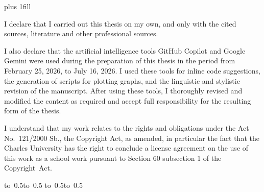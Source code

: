 \newpage


\openright
\hypersetup{pageanchor=true}
\vglue 0pt plus 1fill

\noindent
I declare that I carried out this \ThesisTypeName{} thesis on my own, and only with the cited
sources, literature and other professional sources.

I also declare that the artificial intelligence tools GitHub Copilot and Google Gemini were used during the preparation of this thesis in the period from February 25, 2026, to July 16, 2026.
I used these tools for inline code suggestions, the generation of scripts for plotting graphs, and the linguistic and stylistic revision of the manuscript.
After using these tools, I thoroughly revised and modified the content as required and accept full responsibility for the resulting form of the thesis.

I understand that my work relates to the rights and obligations under the Act No.~121/2000 Sb.,
the Copyright Act, as amended, in particular the fact that the Charles
University has the right to conclude a license agreement on the use of this
work as a school work pursuant to Section 60 subsection 1 of the Copyright~Act.

\vspace{10mm}

\hbox{\hbox to 0.5\hbox to 0.5\hsize{\dotfill\quad}}
\smallskip
\hbox{\hbox to 0.5\hsize{}\hbox to 0.5}

\vspace{20mm}
\newpage


\openright

\noindent
\Dedication

\newpage


